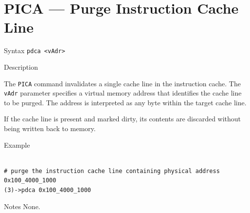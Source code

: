 %
%
\pagebreak
\section*{PICA — Purge Instruction Cache Line}

\begin{iPageDescEntry}{Syntax}
\texttt{pdca <vAdr>}
\end{iPageDescEntry}

\begin{iPageDescEntry}{Description}

The \texttt{PICA} command invalidates a single cache line in the instruction cache. The
\texttt{vAdr} parameter specifies a virtual memory address that identifies the
cache line to be purged. The address is interpreted as any byte within the target
cache line.

If the cache line is present and marked dirty, its contents are discarded without
being written back to memory.

\end{iPageDescEntry}

\begin{iPageDescOpEntry}{Example}
\begin{lstlisting}[style=iPageOpStyle]

# purge the instruction cache line containing physical address 0x100_4000_1000
(3)->pdca 0x100_4000_1000

\end{lstlisting}
\end{iPageDescOpEntry}

\begin{iPageDescEntry}{Notes}
None.
\end{iPageDescEntry}

